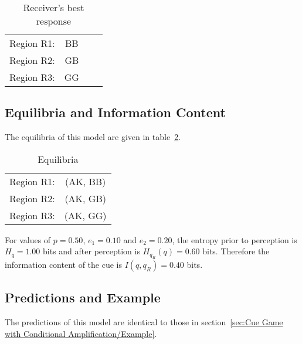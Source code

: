 \documentclass[a4paper,12pt]{article}
\numberwithin{equation}{section}
\begin{document}
\begin{table}[h]
\begin{center}
\begin{tabular}{lccc}
Region R1: & BB\\
Region R2: & GB\\
Region R3: & GG
\end{tabular}
\end{center}
\caption{Receiver's best response}
\label{tab:CueGamewithUnobservableAmplification/BestResponseR}
\end{table}


\subsection{Equilibria and Information Content}
\label{sec:Cue Game with Unobservable Amplification/Equilibria}

The equilibria of this model are given in table~\ref{tab:CueGamewithUnobservableAmplification/Equilibria}.

\begin{table}[!h]
\begin{center}
\begin{tabular}{lc}
Region R1: & (AK, BB)\\
Region R2: & (AK, GB)\\
Region R3: & (AK, GG)
\end{tabular}
\end{center}
\caption{Equilibria}
\label{tab:CueGamewithUnobservableAmplification/Equilibria}
\end{table}

For values of $p = 0.50$, $e_{1} = 0.10$ and $e_{2} = 0.20$, the entropy prior to perception is $H_{q} = 1.00$ bits and after perception is $H_{q_{R}}(q) = 0.60$ bits. Therefore the information content of the cue is $I(q, q_{R}) = 0.40$ bits.


\subsection{Predictions and Example}
\label{sec:Cue Game with Unobservable Amplification/Example}

The predictions of this model are identical to those in section~\ref{sec:Cue Game with Conditional Amplification/Example}.
\end{document}
